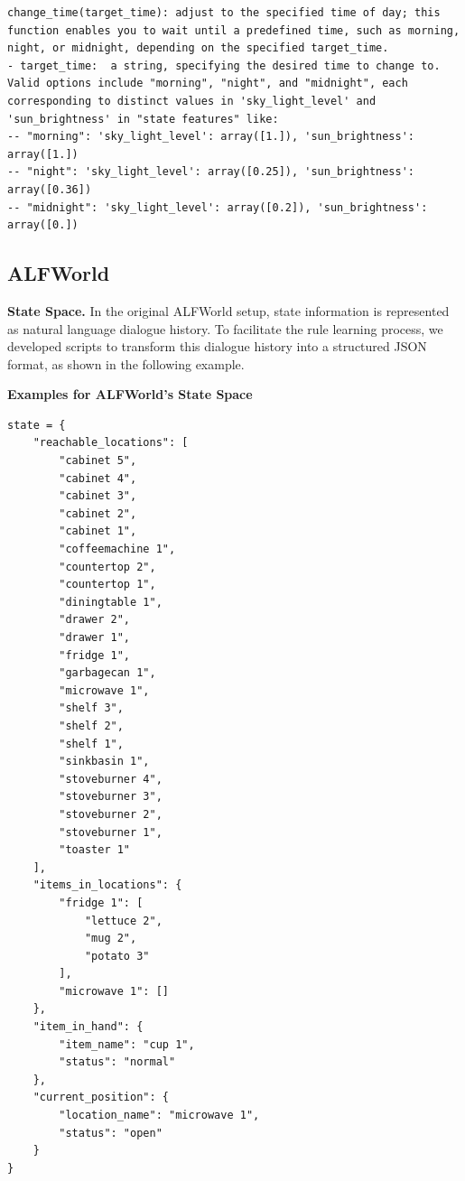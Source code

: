 \documentclass{article} %
\begin{document}
\begin{lstlisting}
change_time(target_time): adjust to the specified time of day; this function enables you to wait until a predefined time, such as morning, night, or midnight, depending on the specified target_time.
- target_time:  a string, specifying the desired time to change to. Valid options include "morning", "night", and "midnight", each corresponding to distinct values in 'sky_light_level' and 'sun_brightness' in "state features" like:
-- "morning": 'sky_light_level': array([1.]), 'sun_brightness': array([1.])
-- "night": 'sky_light_level': array([0.25]), 'sun_brightness': array([0.36])
-- "midnight": 'sky_light_level': array([0.2]), 'sun_brightness': array([0.])
\end{lstlisting}

\subsection{ALFWorld}
\label{sec: ALFworld Environments' State Space and Action Space}

\textbf{State Space.} In the original ALFWorld setup, state information is represented as natural language dialogue history. To facilitate the rule learning process, we developed scripts to transform this dialogue history into a structured JSON format, as shown in the following example.

\begin{center}
    \textbf{Examples for ALFWorld's State Space}
\end{center}
\lstset{language=}
\begin{lstlisting}
state = {
    "reachable_locations": [
        "cabinet 5",
        "cabinet 4",
        "cabinet 3",
        "cabinet 2",
        "cabinet 1",
        "coffeemachine 1",
        "countertop 2",
        "countertop 1",
        "diningtable 1",
        "drawer 2",
        "drawer 1",
        "fridge 1",
        "garbagecan 1",
        "microwave 1",
        "shelf 3",
        "shelf 2",
        "shelf 1",
        "sinkbasin 1",
        "stoveburner 4",
        "stoveburner 3",
        "stoveburner 2",
        "stoveburner 1",
        "toaster 1"
    ],
    "items_in_locations": {
        "fridge 1": [
            "lettuce 2",
            "mug 2",
            "potato 3"
        ],
        "microwave 1": []
    },
    "item_in_hand": {
        "item_name": "cup 1",
        "status": "normal"
    },
    "current_position": {
        "location_name": "microwave 1",
        "status": "open"
    }
}
\end{lstlisting}
\end{document}
